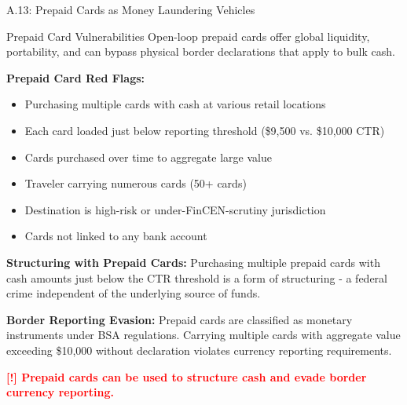 \documentclass[11pt,a4paper]{beamer}
\newcommand{\redflag}[1]{\textcolor{red}{\textbf{[!] #1}}}
\begin{document}
	\begin{frame}{A.13: Prepaid Cards as Money Laundering Vehicles}
		\begin{block}{Prepaid Card Vulnerabilities}
			Open-loop prepaid cards offer global liquidity, portability, and can bypass physical border declarations that apply to bulk cash.
		\end{block}
		\textbf{Prepaid Card Red Flags:}
		\begin{itemize}
			\item Purchasing multiple cards with cash at various retail locations
			\item Each card loaded just below reporting threshold (\$9,500 vs. \$10,000 CTR)
			\item Cards purchased over time to aggregate large value
			\item Traveler carrying numerous cards (50+ cards)
			\item Destination is high-risk or under-FinCEN-scrutiny jurisdiction
			\item Cards not linked to any bank account
		\end{itemize}
		\textbf{Structuring with Prepaid Cards:}
		Purchasing multiple prepaid cards with cash amounts just below the CTR threshold is a form of structuring - a federal crime independent of the underlying source of funds.
		
		\textbf{Border Reporting Evasion:}
		Prepaid cards are classified as monetary instruments under BSA regulations. Carrying multiple cards with aggregate value exceeding \$10,000 without declaration violates currency reporting requirements.
		
		\redflag{Prepaid cards can be used to structure cash and evade border currency reporting.}
	\end{frame}
	
\end{document}
